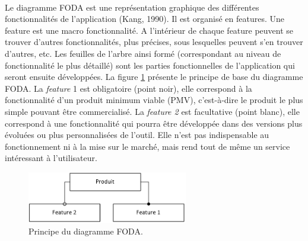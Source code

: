 			\paragraph{}%
			Le diagramme FODA est une représentation graphique des différentes
			fonctionnalités de l’application (Kang, 1990). Il est organisé en features.
			Une feature est une macro fonctionnalité. A l’intérieur de chaque feature
			peuvent se trouver d’autres fonctionnalités, plus précises, sous lesquelles
			peuvent s’en trouver d’autres, etc. Les feuilles de l’arbre ainsi formé
			(correspondant au niveau de fonctionnalité le plus détaillé) sont les parties
			fonctionnelles de l’application qui seront ensuite développées.\newline
			La figure \ref{foda_legende} présente le principe de base du diagramme FODA.
			La \textit{feature} 1 est obligatoire (point noir), elle correspond à la
			fonctionnalité d'un produit minimum viable (PMV), c'est-à-dire le produit le
			plus simple pouvant être commercialisé.
			La \textit{feature 2} est facultative (point blanc), elle correspond à une fonctionnalité qui pourra être
			développée dans des versions plus évoluées ou plus personnalisées de
			l’outil. Elle n’est pas indispensable au fonctionnement ni à la mise sur le
			marché, mais rend tout de même un service intéressant à l'utilisateur.
			\begin{figure}[H]%
				\centering
				\includegraphics[width=7cm]{../img/foda_legende.png}
				\caption{\label{foda_legende} Principe du diagramme FODA.}
			\end{figure}
			
